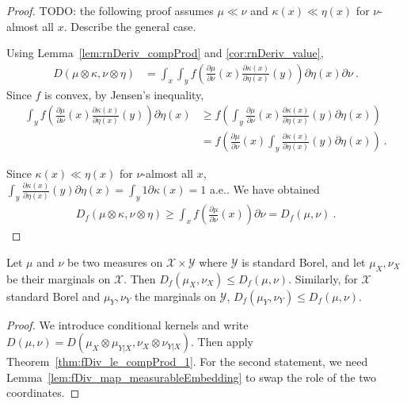 \begin{proof}\leanok
{}
TODO: the following proof assumes $\mu \ll \nu$ and $\kappa(x) \ll \eta(x)$ for $\nu$-almost all $x$. Describe the general case.

Using Lemma~\ref{lem:rnDeriv_compProd} and \ref{cor:rnDeriv_value},
\begin{align*}
D(\mu \otimes \kappa, \nu \otimes \eta)
&= \int_x \int_y f \left( \frac{\partial \mu}{\partial\nu}(x) \frac{\partial \kappa(x)}{\partial\eta(x)}(y) \right) \partial \eta(x) \partial \nu
\: .
\end{align*}
Since $f$ is convex, by Jensen's inequality,
\begin{align*}
\int_y f \left( \frac{\partial \mu}{\partial\nu}(x) \frac{\partial \kappa(x)}{\partial\eta(x)}(y) \right) \partial \eta(x)
&\ge f \left( \int_y \frac{\partial \mu}{\partial\nu}(x) \frac{\partial \kappa(x)}{\partial\eta(x)}(y) \partial \eta(x) \right)
\\
&= f \left( \frac{\partial \mu}{\partial\nu}(x) \int_y \frac{\partial \kappa(x)}{\partial\eta(x)}(y) \partial \eta(x) \right)
\: .
\end{align*}

Since $\kappa(x) \ll \eta(x)$ for $\nu$-almost all $x$, $\int_y \frac{\partial \kappa(x)}{\partial\eta(x)}(y) \partial \eta(x) = \int_y 1 \partial \kappa(x) = 1$ a.e.. We have obtained
\begin{align*}
D_f(\mu \otimes \kappa, \nu \otimes \eta)
\ge \int_x f \left( \frac{\partial \mu}{\partial\nu}(x)\right) \partial \nu
= D_f(\mu, \nu)
\: .
\end{align*}
\end{proof}


\begin{theorem}[Marginals]
  \label{thm:fDiv_fst_le_1}
  \leanok
  Let $\mu$ and $\nu$ be two measures on $\mathcal X \times \mathcal Y$ where $\mathcal Y$ is standard Borel, and let $\mu_X, \nu_X$ be their marginals on $\mathcal X$.
  Then $D_f(\mu_X, \nu_X) \le D_f(\mu, \nu)$.
  Similarly, for $\mathcal X$ standard Borel and $\mu_Y, \nu_Y$ the marginals on $\mathcal Y$, $D_f(\mu_Y, \nu_Y) \le D_f(\mu, \nu)$.
\end{theorem}

\begin{proof}\leanok
{}
We introduce conditional kernels and write $D(\mu, \nu) = D(\mu_X \otimes \mu_{Y|X}, \nu_X \otimes \nu_{Y|X})$. Then apply Theorem~\ref{thm:fDiv_le_compProd_1}.
For the second statement, we need Lemma~\ref{lem:fDiv_map_measurableEmbedding} to swap the role of the two coordinates.
\end{proof}


